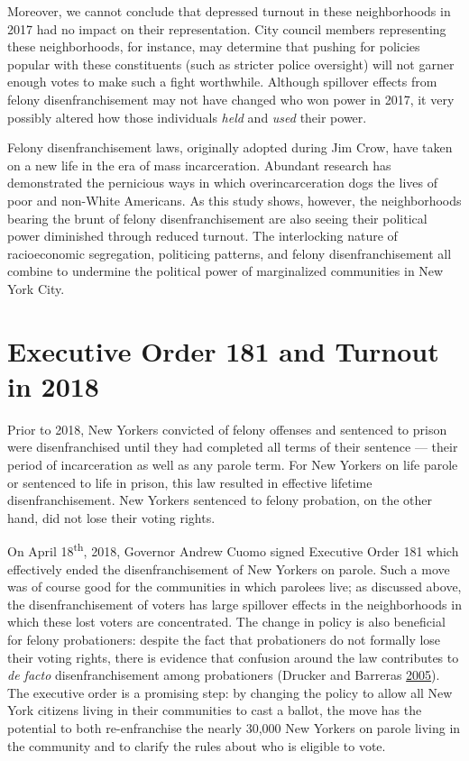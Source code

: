 \documentclass[12pt,]{article}
\begin{document}
Moreover, we cannot conclude that depressed turnout in these neighborhoods in 2017 had no impact on their representation. City council members representing these neighborhoods, for instance, may determine that pushing for policies popular with these constituents (such as stricter police oversight) will not garner enough votes to make such a fight worthwhile. Although spillover effects from felony disenfranchisement may not have changed who won power in 2017, it very possibly altered how those individuals \emph{held} and \emph{used} their power.

Felony disenfranchisement laws, originally adopted during Jim Crow, have taken on a new life in the era of mass incarceration. Abundant research has demonstrated the pernicious ways in which overincarceration dogs the lives of poor and non-White Americans. As this study shows, however, the neighborhoods bearing the brunt of felony disenfranchisement are also seeing their political power diminished through reduced turnout. The interlocking nature of racioeconomic segregation, politicing patterns, and felony disenfranchisement all combine to undermine the political power of marginalized communities in New York City.

\pagebreak

\hypertarget{executive-order-181-and-turnout-in-2018}{%
\section{Executive Order 181 and Turnout in 2018}\label{executive-order-181-and-turnout-in-2018}}

Prior to 2018, New Yorkers convicted of felony offenses and sentenced to prison were disenfranchised until they had completed all terms of their sentence --- their period of incarceration as well as any parole term. For New Yorkers on life parole or sentenced to life in prison, this law resulted in effective lifetime disenfranchisement. New Yorkers sentenced to felony probation, on the other hand, did not lose their voting rights.

On April 18\textsuperscript{th}, 2018, Governor Andrew Cuomo signed Executive Order 181 which effectively ended the disenfranchisement of New Yorkers on parole. Such a move was of course good for the communities in which parolees live; as discussed above, the disenfranchisement of voters has large spillover effects in the neighborhoods in which these lost voters are concentrated. The change in policy is also beneficial for felony probationers: despite the fact that probationers do not formally lose their voting rights, there is evidence that confusion around the law contributes to \emph{de facto} disenfranchisement among probationers (Drucker and Barreras \protect\hyperlink{ref-Drucker2005}{2005}). The executive order is a promising step: by changing the policy to allow all New York citizens living in their communities to cast a ballot, the move has the potential to both re-enfranchise the nearly 30,000 New Yorkers on parole living in the community and to clarify the rules about who is eligible to vote.
\end{document}
